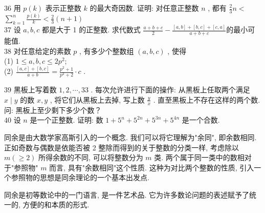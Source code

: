 36 用 $p(k)$ 表示正整数 $k$ 的最大奇因数. 证明: 对任意正整数 $n$ , 都有 $\frac{2}{3} n<$ $\sum_{k=1}^{n} \frac{p(k)}{k}<\frac{2}{3}(n+1)$\\
37 设 $a ,  b ,  c$ 都是大于 1 的正整数. 求代数式 $\frac{a+b+c}{2}-\frac{[a, b]+[b, c]+[c, a]}{a+b+c}$的最小可能值. \\
38 对任意给定的素数 $p$ , 有多少个整数组 $(a, b, c)$ , 使得\\
(1) $1 \leqslant a, b, c \leqslant 2 p^{2}$;\\
(2) $\frac{[a, c]+[b, c]}{a+b}=\frac{p^{2}+1}{p^{2}+2} \cdot c$ .

39 黑板上写着数 $1,2, \cdots, 33$ . 每次允许进行下面的操作: 从黑板上任取两个满足 $x \mid y$ 的数 $x ,  y$ , 将它们从黑板上去掉, 写上数 $\frac{y}{x}$ . 直至黑板上不存在这样的两个数. 问: 黑板上至少剩下多少个数？\\
40 设 $n$ 是一个正整数. 证明: 数 $1+5^{n}+5^{2 n}+5^{3 n}+5^{4 n}$ 是一个合数.

同余是由大数学家高斯引入的一个概念. 我们可以将它理解为"余同", 即余数相同. 正如奇数与偶数是依能否被 2 整除而得到的关于整数的分类一样, 考虑除以 $m(\geqslant 2)$ 所得余数的不同, 可以将整数分为 $m$ 类. 两个属于同一类中的数相对于"参照物" $m$ 而言, 具有"余数相同"这个性质. 这种为对比两个整数的性质, 引入一个参照物的思想是同余理论的一个基本出发点.

同余是初等数论中的一门语言, 是一件艺术品. 它为许多数论问题的表述赋予了统一的, 方便的和本质的形式.


